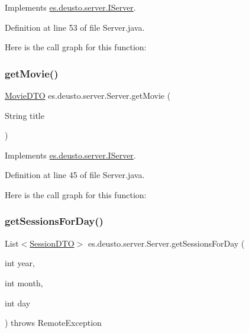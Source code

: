 Implements \mbox{\hyperlink{interfacees_1_1deusto_1_1server_1_1_i_server_a0b3243dc04d49f7659fefec4e4fb43b7}{es.\+deusto.\+server.\+I\+Server}}.



Definition at line 53 of file Server.\+java.

Here is the call graph for this function\+:
\mbox{\label{classes_1_1deusto_1_1server_1_1_server_a7e4544c63bcf2b2d3abce0d2ff1567ac}} 
\subsubsection{\texorpdfstring{getMovie()}{getMovie()}}
{\footnotesize\ttfamily \mbox{\hyperlink{classes_1_1deusto_1_1server_1_1data_1_1_movie_d_t_o}{Movie\+D\+TO}} es.\+deusto.\+server.\+Server.\+get\+Movie (\begin{DoxyParamCaption}\item[{String}]{title }\end{DoxyParamCaption})}



Implements \mbox{\hyperlink{interfacees_1_1deusto_1_1server_1_1_i_server_a2b7883e416d98a7c92de13cbed7af450}{es.\+deusto.\+server.\+I\+Server}}.



Definition at line 45 of file Server.\+java.

Here is the call graph for this function\+:
\mbox{\label{classes_1_1deusto_1_1server_1_1_server_a688ca336b3cbdb5c04ecdc4f23ff65d1}} 
\subsubsection{\texorpdfstring{getSessionsForDay()}{getSessionsForDay()}}
{\footnotesize\ttfamily List$<$\mbox{\hyperlink{classes_1_1deusto_1_1server_1_1data_1_1_session_d_t_o}{Session\+D\+TO}}$>$ es.\+deusto.\+server.\+Server.\+get\+Sessions\+For\+Day (\begin{DoxyParamCaption}\item[{int}]{year,  }\item[{int}]{month,  }\item[{int}]{day }\end{DoxyParamCaption}) throws Remote\+Exception}



